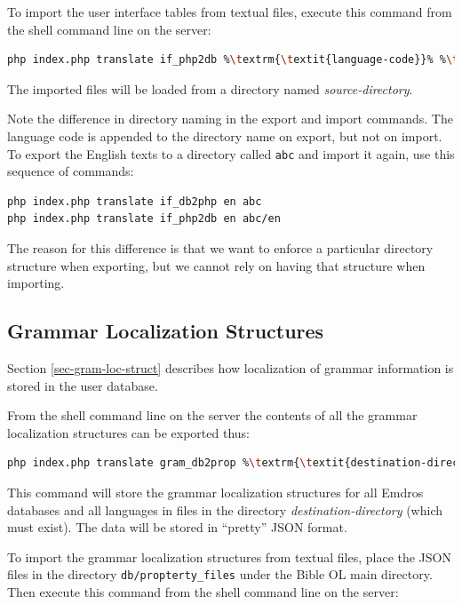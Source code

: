 \documentclass[11pt,oneside,a4paper]{memoir}
\begin{document}
To import the user interface tables from textual files, execute this command from the shell command
line on the server:

\begin{lstlisting}[language=bash,basicstyle={\ttfamily}]
php index.php translate if_php2db %\textrm{\textit{language-code}}% %\textrm{\textit{source-directory}}%
\end{lstlisting}

The imported files will be loaded from a directory named \emph{source-directory}.

Note the difference in directory naming in the export and import commands. The language code is
appended to the directory name on export, but not on import. To export the English
texts to a directory called \texttt{abc} and import it again, use this sequence of commands:

\begin{lstlisting}[language=bash,basicstyle={\ttfamily}]
php index.php translate if_db2php en abc
php index.php translate if_php2db en abc/en
\end{lstlisting}

The reason for this difference is that we want to enforce a particular directory structure when
exporting, but we cannot rely on having that structure when importing.

\subsection{Grammar Localization Structures}

Section \ref{sec-gram-loc-struct} describes how localization of grammar information is stored in the
user database.

From the shell command line on the server the contents of all the grammar localization structures can be exported
thus:

\begin{lstlisting}[language=bash,basicstyle={\ttfamily}]
php index.php translate gram_db2prop %\textrm{\textit{destination-directory}}%
\end{lstlisting}

This command will store the grammar localization structures for all Emdros databases and all
languages in files in the directory \emph{destination-directory} (which must exist). The data will
be stored in ``pretty'' JSON format.

To import the grammar localization structures from textual files, place the JSON files in the directory
\texttt{db/propterty\_files} under the Bible OL main directory. Then execute this command from the
shell command line on the server:
\end{document}
